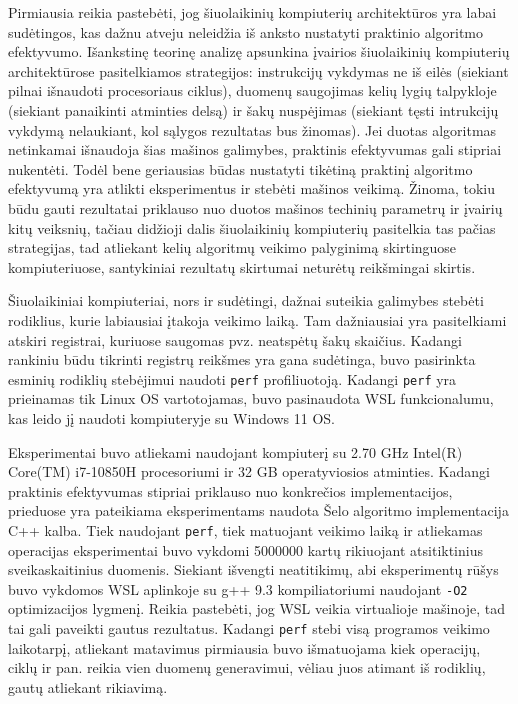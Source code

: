 \documentclass{VUMIFInfBakalaurinis}
\begin{document}
Pirmiausia reikia pastebėti, jog šiuolaikinių kompiuterių architektūros yra labai sudėtingos, kas dažnu atveju neleidžia iš anksto nustatyti praktinio algoritmo efektyvumo.
Išankstinę teorinę analizę apsunkina įvairios šiuolaikinių kompiuterių architektūrose pasitelkiamos strategijos:
instrukcijų vykdymas ne iš eilės (siekiant pilnai išnaudoti procesoriaus ciklus),
duomenų saugojimas kelių lygių talpykloje (siekiant panaikinti atminties delsą) ir
šakų nuspėjimas (siekiant tęsti intrukcijų vykdymą nelaukiant, kol sąlygos rezultatas bus žinomas).
Jei duotas algoritmas netinkamai išnaudoja šias mašinos galimybes, praktinis efektyvumas gali stipriai nukentėti.
Todėl bene geriausias būdas nustatyti tikėtiną praktinį algoritmo efektyvumą yra atlikti eksperimentus ir stebėti mašinos veikimą.
Žinoma, tokiu būdu gauti rezultatai priklauso nuo duotos mašinos techinių parametrų ir įvairių kitų veiksnių, tačiau didžioji dalis
šiuolaikinių kompiuterių pasitelkia tas pačias strategijas, tad atliekant kelių algoritmų veikimo palyginimą skirtinguose kompiuteriuose,
santykiniai rezultatų skirtumai neturėtų reikšmingai skirtis.  

Šiuolaikiniai kompiuteriai, nors ir sudėtingi, dažnai suteikia galimybes stebėti rodiklius, kurie labiausiai įtakoja veikimo laiką.
Tam dažniausiai yra pasitelkiami atskiri registrai, kuriuose saugomas pvz. neatspėtų šakų skaičius.
Kadangi rankiniu būdu tikrinti registrų reikšmes yra gana sudėtinga, buvo pasirinkta esminių rodiklių stebėjimui naudoti \verb|perf| profiliuotoją.
Kadangi \verb|perf| yra prieinamas tik Linux OS vartotojamas, buvo pasinaudota WSL funkcionalumu, kas leido jį naudoti kompiuteryje su Windows 11 OS.

Eksperimentai buvo atliekami naudojant kompiuterį su 2.70 GHz Intel(R) Core(TM) i7-10850H procesoriumi ir 32 GB operatyviosios atminties.
Kadangi praktinis efektyvumas stipriai priklauso nuo konkrečios implementacijos, prieduose yra pateikiama eksperimentams naudota Šelo algoritmo implementacija C++ kalba.
Tiek naudojant \verb|perf|, tiek matuojant veikimo laiką ir atliekamas operacijas eksperimentai buvo vykdomi 5000000 kartų rikiuojant
atsitiktinius sveikaskaitinius duomenis.
Siekiant išvengti neatitikimų, abi eksperimentų rūšys buvo vykdomos WSL aplinkoje su g++ 9.3 kompiliatoriumi naudojant \verb|-O2| optimizacijos lygmenį.
Reikia pastebėti, jog WSL veikia virtualioje mašinoje, tad tai gali paveikti gautus rezultatus.
Kadangi \verb|perf| stebi visą programos veikimo laikotarpį, atliekant matavimus pirmiausia buvo išmatuojama kiek operacijų, ciklų ir pan. reikia vien duomenų generavimui,
vėliau juos atimant iš rodiklių, gautų atliekant rikiavimą.
\end{document}
